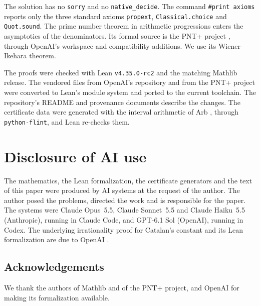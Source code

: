 \documentclass[11pt]{amsart}
\theoremstyle{definition}
\theoremstyle{remark}
\numberwithin{equation}{section}
\newcommand{\lean}[1]{\nolinkurl{#1}}
\begin{document}
The solution has no \lean{sorry} and no \lean{native_decide}. The command \texttt{\#print axioms} reports only the three
standard axioms \lean{propext}, \lean{Classical.choice} and \lean{Quot.sound}. The prime number theorem in arithmetic
progressions enters the asymptotics of the denominators. Its formal source is the PNT+ project \cite{PNTPlus}, through OpenAI's
workspace and compatibility additions. We use its Wiener--Ikehara theorem.

The proofs were checked with Lean \texttt{v4.35.0-rc2} and the matching Mathlib release. The vendored files from OpenAI's
repository and from the PNT+ project were converted to Lean's module system and ported to the current toolchain. The repository's README and provenance documents describe the changes. The certificate data were generated with
the interval arithmetic of Arb \cite{Arb}, through \texttt{python-flint}, and Lean re-checks them.

\section*{Disclosure of AI use}
The mathematics, the Lean formalization, the certificate generators and the text of this paper were produced by AI
systems at the request of the author. The author posed the problems, directed the work and is responsible for the
paper. The systems were Claude Opus~5.5, Claude Sonnet~5.5 and Claude Haiku~5.5 (Anthropic), running in Claude Code,
and GPT-6.1 Sol (OpenAI), running in Codex. The underlying irrationality proof for Catalan's constant and its Lean
formalization are due to OpenAI \cite{OpenAI2026}.

\subsection*{Acknowledgements}
We thank the authors of Mathlib and of the PNT+ project, and OpenAI for making its formalization available.



\end{document}
